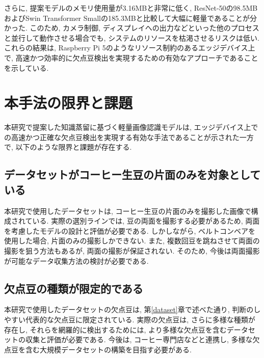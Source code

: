 さらに, 提案モデルのメモリ使用量が3.16MBと非常に低く, ResNet-50の98.5MBおよびSwin Transformer Smallの185.3MBと比較して大幅に軽量であることが分かった. 
このため, カメラ制御, ディスプレイへの出力などといった他のプロセスと並行して動作させる場合でも, システムのリソースを枯渇させるリスクは低い. 
これらの結果は, Raspberry Pi 5のようなリソース制約のあるエッジデバイス上で, 高速かつ効率的に欠点豆検出を実現するための有効なアプローチであることを示している.

\section{本手法の限界と課題}
本研究で提案した知識蒸留に基づく軽量画像認識モデルは, エッジデバイス上での高速かつ正確な欠点豆検出を実現する有効な手法であることが示された一方で, 以下のような限界と課題が存在する. 

\subsection{データセットがコーヒー生豆の片面のみを対象としている} 
本研究で使用したデータセットは, コーヒー生豆の片面のみを撮影した画像で構成されている. 
実際の選別ラインでは, 豆の両面を撮影する必要があるため, 両面を考慮したモデルの設計と評価が必要である. 
しかしながら, ベルトコンベアを使用した場合, 片面のみの撮影しかできない. 
また, 複数回豆を跳ねさせて両面の撮影を狙う方法もあるが, 両面の撮影が保証されない.
そのため, 今後は両面撮影が可能なデータ収集方法の検討が必要である.

\subsection{欠点豆の種類が限定的である}
本研究で使用したデータセットの欠点豆は, 第\ref{dataset}章で述べた通り, 判断のしやすい代表的な欠点豆に限定されている. 
実際の欠点豆は, さらに多様な種類が存在し, それらを網羅的に検出するためには, より多様な欠点豆を含むデータセットの収集と評価が必要である.
今後は, コーヒー専門店などと連携し, 多様な欠点豆を含む大規模データセットの構築を目指す必要がある.

